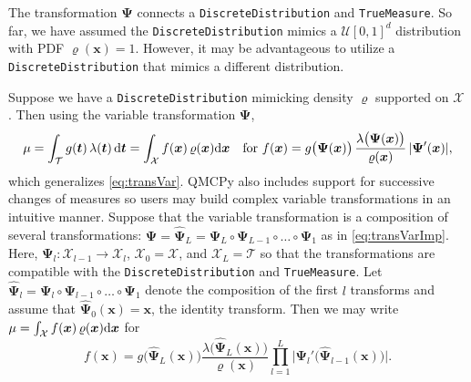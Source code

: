 \documentclass[graybox]{svmult}
\begin{document}
The transformation $\boldsymbol{\Psi}$  connects a \texttt{DiscreteDistribution} and \texttt{TrueMeasure}. So far, we have assumed the \texttt{DiscreteDistribution} mimics a $\mathcal{U}[0,1]^d$ distribution with PDF $\varrho(\boldsymbol{x})=1$. However, it may be advantageous to utilize a \texttt{DiscreteDistribution} that mimics a different distribution. 

Suppose we have a \texttt{DiscreteDistribution} mimicking  density $\varrho$ supported on $\mathcal{X}$.  Then using the variable transformation $\boldsymbol{\Psi}$, 
\begin{equation*}
	\mu = \int_\mathcal{T} g(\boldsymbol{t}) \, \lambda(\boldsymbol{t}) \, \mathrm{d} \boldsymbol{t}  =  \int_{\mathcal{X}}f(\boldsymbol{x}) \, \varrho(\boldsymbol{x}) \mathrm{d} \boldsymbol{x} \quad \text{for }
   f(\boldsymbol{x})  = g\bigl(\boldsymbol{\Psi}(\boldsymbol{x})\bigr)  \, \frac{\lambda\bigl(\boldsymbol{\Psi}(\boldsymbol{x})\bigr)}{\varrho(\boldsymbol{x})} \, \lvert \boldsymbol{\Psi}'(\boldsymbol{x})\rvert,
\end{equation*}
which generalizes \eqref{eq:transVar}.
QMCPy also includes support for successive changes of measures so users may build complex variable transformations in an intuitive manner. Suppose that the variable transformation is a composition of several transformations: $\boldsymbol{\Psi}=\widehat{\boldsymbol{\Psi}}_L = \boldsymbol{\Psi}_L \circ \boldsymbol{\Psi}_{L-1} \circ \dots \circ \boldsymbol{\Psi}_1$ as in \eqref{eq:transVarImp}. Here, $\boldsymbol{\Psi}_l:\mathcal{X}_{l-1} \to \mathcal{X}_l$,  $\mathcal{X}_0=\mathcal{X}$, and $\mathcal{X}_L=\mathcal{T}$ so that the transformations are compatible with the \texttt{DiscreteDistribution} and \texttt{TrueMeasure}. Let $\widehat{\boldsymbol{\Psi}}_l=\boldsymbol{\Psi}_l \circ \boldsymbol{\Psi}_{l-1} \circ \dots \circ \boldsymbol{\Psi}_1$ denote the composition of the first $l$ transforms and assume that $\widehat{\boldsymbol{\Psi}}_0(\boldsymbol{x})=\boldsymbol{x}$, the identity transform. Then we may write $\mu =  \int_{\mathcal{X}}f(\boldsymbol{x}) \, \varrho(\boldsymbol{x}) \mathrm{d} \boldsymbol{x}$ for 
\begin{equation*}
    f(\boldsymbol{x}) 
 = g\bigl(\widehat{\boldsymbol{\Psi}}_L(\boldsymbol{x})\bigr)\frac{\lambda\bigl(\widehat{\boldsymbol{\Psi}}_L(\boldsymbol{x})\bigr)}{\varrho(\boldsymbol{x})}\prod_{l=1}^L \bigl\lvert \boldsymbol{\Psi}_l'\bigl(\widehat{\boldsymbol{\Psi}}_{l-1}(\boldsymbol{x})\bigr) \bigr\rvert .
\end{equation*}
\end{document}
